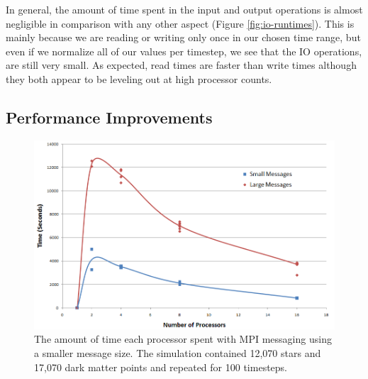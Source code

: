 \documentclass{article}
\begin{document}
In general, the amount of time spent in the input and output operations is almost negligible in comparison with any other aspect (Figure \ref{fig:io-runtimes}).  This is mainly because we are  reading or writing only once in our chosen time range, but even if we normalize all of our values per timestep, we see that the IO operations, are still very small. As expected, read times are faster than write times although they both appear to be leveling out at high processor counts. 

\subsection{Performance Improvements}

\begin{figure}
\centering
\includegraphics[width=\columnwidth]{Smallmessage-runtimes.png}
\caption{The amount of time each processor spent with MPI messaging using a smaller message size. The simulation contained 12,070 stars and 17,070 dark matter points and repeated for 100 timesteps. \label{fig:Smallmessages-runtimes}}
\end{figure} 
\end{document}
